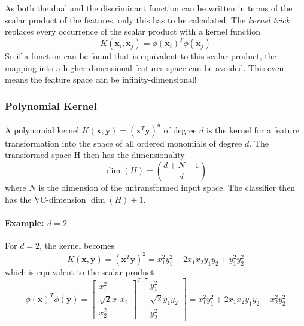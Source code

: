 \documentclass[a4paper, 11pt, accentcolor = tud3b]{tudreport}
\renewcommand{\vec}[1]{\mathbf{#1}}
\begin{document}
				As both the dual and the discriminant function can be written in terms of the scalar product of the features, only this has to be calculated. The \emph{kernel trick} replaces every occurrence of the scalar product with a kernel function
				\begin{equation}
					K(\vec{x}_i, \vec{x}_j) = \phi(\vec{x}_i)^T \phi(\vec{x}_j)
				\end{equation}
				So if a function can be found that is equivalent to this scalar product, the mapping into a higher-dimensional features space can be avoided. This even means the feature space can be infinity-dimensional!

				\subsubsection{Polynomial Kernel}
					A polynomial kernel \( K(\vec{x}, \vec{y}) = (\vec{x}^T \vec{y})^d \) of degree \(d\) is the kernel for a feature transformation into the space of all ordered monomials of degree \(d\). The transformed space H then has the dimensionality
					\begin{equation}
						\dim(H) = { d + N - 1 \choose d }
					\end{equation}
					where \(N\) is the dimension of the untransformed input space. The classifier then has the VC-dimension \( \dim(H) + 1 \).
					
					\paragraph{Example: \(d = 2\)}
						For \(d = 2\), the kernel becomes
						\begin{equation}
							K(\vec{x}, \vec{y}) = (\vec{x}^T \vec{y})^2 = x_1^2 y_1^2 + 2 x_1 x_2 y_1 y_2 + y_1^2 y_2^2
						\end{equation}
						which is equivalent to the scalar product
						\begin{equation}
							\phi(\vec{x})^T \phi(\vec{y}) =
								\begin{bmatrix}
									x_1^2 \\
									\sqrt{2} x_1 x_2 \\
									x_2^2
								\end{bmatrix}^T
								\begin{bmatrix}
									y_1^2 \\
									\sqrt{2} y_1 y_2 \\
									y_2^2
								\end{bmatrix}
							= x_1^2 y_1^2 + 2 x_1 x_2 y_1 y_2 + x_2^2 y_2^2
						\end{equation}
\end{document}
